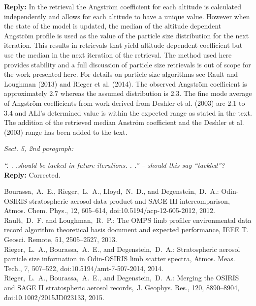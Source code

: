 \documentclass[12pt, notitlepage]{article}
\begin{document}
\textbf{Reply:} In the retrieval the Angstr\"{o}m coefficient for each altitude is calculated independently and allows for each altitude to have a unique value. However when the state of the model is updated, the median of the altitude dependent Angstr\"{o}m profile is used as the value of the particle size distribution for the next iteration. This results in retrievals that yield altitude dependent coefficient but use the median in the next iteration of the retrieval. The method used here provides stability and a full discussion of particle size retrievals is out of scope for the work presented here. For details on particle size algorithms see Rault and Loughman (2013) and  Rieger et al. (2014). The observed Angstr\"{o}m coefficient is approximately 2.7 whereas the assumed distribution is 2.3. The fine mode average of Angstr\"{o}m coefficients from work derived from Deshler et al. (2003) are 2.1 to 3.4 and ALI's determined value is within the expected range as stated in the text. The addition of the retrieved median Anstr\"{o}m coefficient and the Deshler et al. (2003) range has been added to the text.

\hrulefill

\textit{Sect. 5, 2nd paragraph:}

\textit{``. . .should be tacked in future iterations. . .'' – should this say ``tackled''?}\\

\textbf{Reply:} Corrected.

\hrulefill

Bourassa,~A.~E., Rieger,~L.~A., Lloyd,~N.~D., and Degenstein,~D.~A.:
Odin-OSIRIS stratospheric aerosol data product and SAGE III intercomparison,
Atmos. Chem. Phys., 12, 605--614,
doi:10.5194/acp-12-605-2012,
2012.\\

Rault,~D.~F. and Loughman,~R.~P.: The OMPS limb profiler environmental data
record algorithm theoretical basis document and expected performance, IEEE T.
Geosci. Remote, 51, 2505--2527, 2013.\\

Rieger,~L.~A., Bourassa,~A.~E., and Degenstein,~D.~A.: Stratospheric aerosol
particle size information in Odin-OSIRIS limb scatter spectra, Atmos. Meas.
Tech., 7, 507--522,
doi:10.5194/amt-7-507-2014,
2014.\\

Rieger,~L.~A., Bourassa,~A.~E., and Degenstein,~D.~A.: Merging the OSIRIS and
SAGE II stratospheric aerosol records,~J. Geophys. Res., 120, 8890--8904,
doi:10.1002/2015JD023133,
2015.\\
\end{document}
